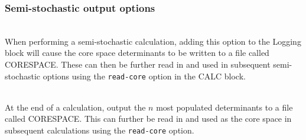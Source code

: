 \documentclass[a4paper,notitlepage,dvipsnames]{scrreprt}
\newcommand\codeitem[1]{\needspace{1.5\baselineskip}\item[\textnormal{\ttfamily #1 \nopagebreak}] \hfill \\ \nopagebreak}
\begin{document}
    \subsubsection{Semi-stochastic output options}
    \begin{description}
      \codeitem{write-core}
      When performing a semi-stochastic calculation, adding this option
      to the Logging block will cause the core space determinants to be
      written to a file called CORESPACE. These can then be further read
      in and used in subsequent semi-stochastic options using the
      \texttt{read-core} option in the CALC block.
      \codeitem{write-most-pop-core-end $n$}
      At the end of a calculation, output the $n$ most populated
      determinants to a file called CORESPACE. This can further be read
      in and used as the core space in subsequent calculations using the
      \texttt{read-core} option.
    \end{description}
\end{document}
